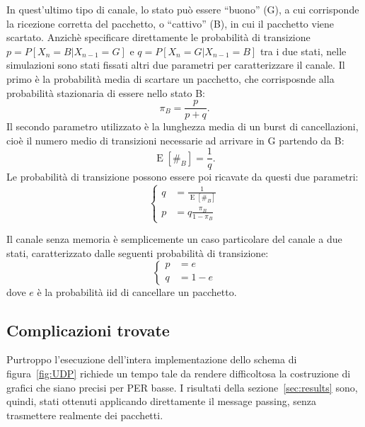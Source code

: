 \documentclass[italian, a4paper, 12pt]{article}
\newcommand{\E}[1]{\operatorname{E}\left[#1\right]}
\newcommand{\EnB}{\E{\#_B}}
\begin{document}
In quest'ultimo tipo di canale, lo stato può essere ``buono'' (G), a
cui corrisponde la ricezione corretta del pacchetto, o ``cattivo''
(B), in cui il pacchetto viene scartato.
%
Anzichè specificare direttamente le probabilità di transizione $p =
P[X_n = B | X_{n-1} = G]$ e $q = P[X_n = G | X_{n-1} = B]$ tra i due
stati, nelle simulazioni sono stati fissati altri due parametri per
caratterizzare il canale.
%
Il primo è la probabilità media di scartare un pacchetto, che
corrisposnde alla probabilità stazionaria di essere nello stato B:
\begin{equation}
  \pi_B = \frac{p}{p+q} .
\end{equation}
%
Il secondo parametro utilizzato è la lunghezza media di un burst di
cancellazioni, cioè il numero medio di transizioni necessarie ad
arrivare in G partendo da B:
\begin{equation}
  \EnB = \frac{1}{q} .
\end{equation}
%
Le probabilità di transizione possono essere poi ricavate da questi due
parametri:
\begin{equation}
  \begin{cases}
    q &= \frac{1}{\EnB} \\
    p &= q \frac{\pi_B}{1 - \pi_B}
  \end{cases}
  \label{eq:mcparams}
\end{equation}


Il canale senza memoria è semplicemente un caso particolare del canale
a due stati, caratterizzato dalle seguenti probabilità di
transizione:
\begin{equation}
  \begin{cases}
    p &= e \\
    q &= 1-e
  \end{cases}
\end{equation}
dove $e$ è la probabilità iid di cancellare un pacchetto.

\subsection{Complicazioni trovate} %
\label{sec:complications}
Purtroppo l'esecuzione dell'intera implementazione dello schema di
figura~\ref{fig:UDP} richiede un tempo tale da rendere difficoltosa la
costruzione di grafici che siano precisi per PER basse.
%
I risultati della sezione~\ref{sec:results} sono, quindi, stati
ottenuti applicando direttamente il message passing, senza trasmettere
realmente dei pacchetti.
\end{document}
